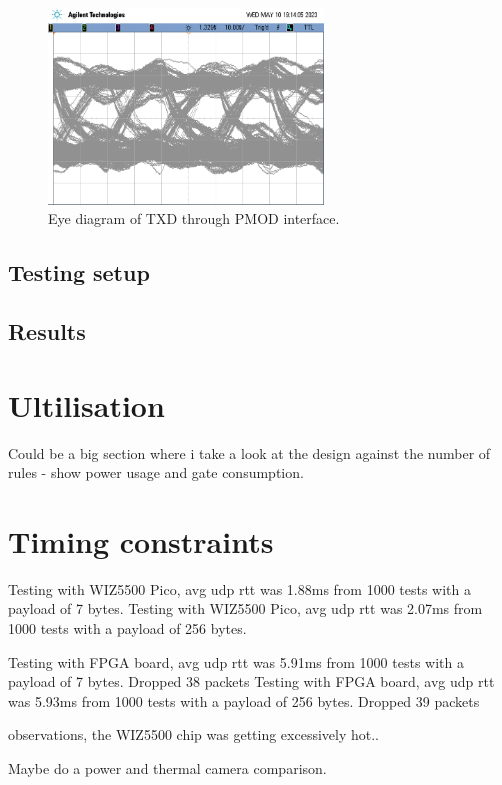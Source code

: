 \begin{figure}[h]
    \centering
    \includegraphics[width=0.65\textwidth]{Images/EyeDiagramTX.png}
    \caption[Eye diagram of TXD through PMOD interface]{Eye diagram of TXD through PMOD interface.}
    \label{fig:eye_diagram}
\end{figure}


\subsection{Testing setup}

\subsection{Results}



\section{Ultilisation}

Could be a big section where i take a look at the design against the number of rules - show power usage and gate consumption.


\section{Timing constraints}
\label{sec:timing_constraints}





Testing with WIZ5500 Pico, avg udp rtt was 1.88ms from 1000 tests with a payload of 7 bytes.
Testing with WIZ5500 Pico, avg udp rtt was 2.07ms from 1000 tests with a payload of 256 bytes.

Testing with FPGA board, avg udp rtt was 5.91ms from 1000 tests with a payload of 7 bytes. Dropped 38 packets
Testing with FPGA board, avg udp rtt was 5.93ms from 1000 tests with a payload of 256 bytes. Dropped 39 packets

observations, the WIZ5500 chip was getting excessively hot..

Maybe do a power and thermal camera comparison.
